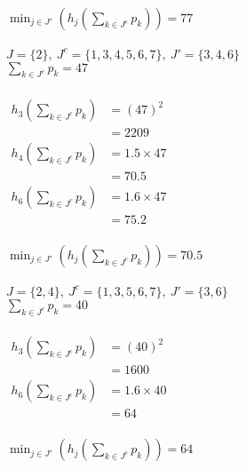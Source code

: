\documentclass[a4paper, fleqn]{article}
\begin{document}
\vspace{1pt}\\
$\min_{j\in J'}\left(h_j\left(\sum_{k\in J^c}p_k\right)\right)=77$\\
\vspace{1pt}\\
$J=\{2\},\ J^c=\{1,3,4,5,6,7\},\ J'=\{3,4,6\}$\\
\vspace{1pt}
$\sum_{k\in J^c}p_k=47$\\
\vspace{1pt}\\
$\begin{aligned}h_3\left(\sum_{k\in J^c}p_k\right)&=(47)^2\\&=2209\end{aligned}$\\
$\begin{aligned}h_4\left(\sum_{k\in J^c}p_k\right)&=1.5\times47\\&=70.5\end{aligned}$\\
$\begin{aligned}h_6\left(\sum_{k\in J^c}p_k\right)&=1.6\times47\\&=75.2\end{aligned}$\\
\vspace{1pt}\\
$\min_{j\in J'}\left(h_j\left(\sum_{k\in J^c}p_k\right)\right)=70.5$\\
\vspace{1pt}\\
$J=\{2,4\},\ J^c=\{1,3,5,6,7\},\ J'=\{3,6\}$\\
\vspace{1pt}
$\sum_{k\in J^c}p_k=40$\\
\vspace{1pt}\\
$\begin{aligned}h_3\left(\sum_{k\in J^c}p_k\right)&=(40)^2\\&=1600\end{aligned}$\\
$\begin{aligned}h_6\left(\sum_{k\in J^c}p_k\right)&=1.6\times40\\&=64\end{aligned}$\\
\vspace{1pt}\\
$\min_{j\in J'}\left(h_j\left(\sum_{k\in J^c}p_k\right)\right)=64$\\
\end{document}
